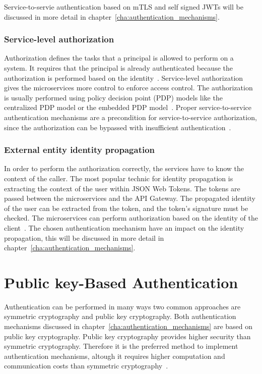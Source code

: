 Service-to-servie authentication based on mTLS and self signed JWTs will be discussed in more detail in chapter~\ref{cha:authentication_mechanisms}.

\subsubsection{Service-level authorization} 
\label{sec:service-level-authorization}
Authorization defines the tasks that a principal is allowed to perform on a system.
It requires that the principal is already authenticated because the authorization is performed based on the identity~\cite{siriwardena2014advanced}. 
Service-level authorization gives the microservices more control to enforce access control.
The authorization is usually performed using policy decision point (PDP) models like the centralized PDP model or the embedded PDP model~\cite{dias2020microservices, barabanov2020authentication}.
Proper service-to-service authentication mechanisms are a precondition for service-to-service authorization, since the authorization can be bypassed with insufficient authentication~\cite{siriwardena2014advanced}.

\subsubsection{External entity identity propagation} 
\label{sec:external-entity-identity-propagation}
In order to perform the authorization correctly, the services have to know the context of the caller.
The most popular technic for identity propagation is extracting the context of the user within JSON Web Tokens.
The tokens are passed between the microservices and the API Gateway.
The propagated identity of the user can be extracted from the token, and the token's signature must be checked.
The microservices can perform authorization based on the identity of the client~\cite{barabanov2020authentication, dias2020microservices}.
The chosen authentication mechanism have an impact on the identity propagation, this will be discussed in more detail in chapter~\ref{cha:authentication_mechanisms}.

\section{Public key-Based Authentication}
Authentication can be performed in many ways two common approaches are symmetric cryptography and public key cryptography.
Both authentication mechanisms discussed in chapter~\ref{cha:authentication_mechanisms} are based on public key cryptography.
Public key cryptography provides higher security than symmetric cryptography.
Therefore it is the preferred method to implement authentication mechanisms, altough it requires higher computation and communication costs than symmetric cryptography~\cite{pubkeycrypto}.

